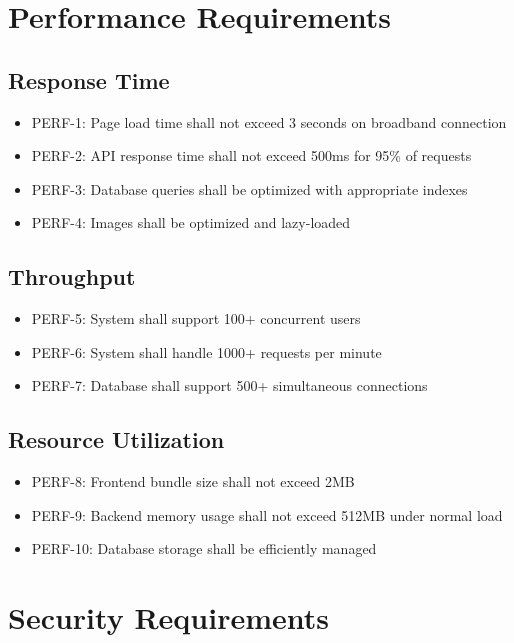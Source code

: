 \documentclass{scrreprt}
\begin{document}
\section{Performance Requirements}

\subsection{Response Time}
\begin{itemize}
\item PERF-1: Page load time shall not exceed 3 seconds on broadband connection
\item PERF-2: API response time shall not exceed 500ms for 95\% of requests
\item PERF-3: Database queries shall be optimized with appropriate indexes
\item PERF-4: Images shall be optimized and lazy-loaded
\end{itemize}

\subsection{Throughput}
\begin{itemize}
\item PERF-5: System shall support 100+ concurrent users
\item PERF-6: System shall handle 1000+ requests per minute
\item PERF-7: Database shall support 500+ simultaneous connections
\end{itemize}

\subsection{Resource Utilization}
\begin{itemize}
\item PERF-8: Frontend bundle size shall not exceed 2MB
\item PERF-9: Backend memory usage shall not exceed 512MB under normal load
\item PERF-10: Database storage shall be efficiently managed
\end{itemize}

\section{Security Requirements}
\end{document}
